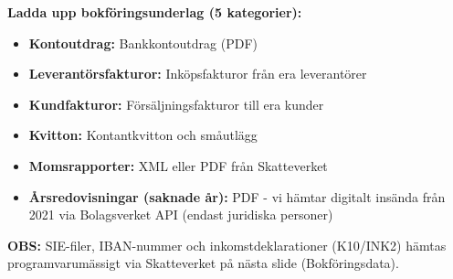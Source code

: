 \documentclass[10pt]{beamer}
\begin{document}
\begin{frame}[label=bokforingsunderlag]
  \vspace{0.4cm}
  \textbf{Ladda upp bokföringsunderlag (5 kategorier):}\\
  \vspace{0.2cm}
  \footnotesize
  \begin{itemize}
    \item \textbf{Kontoutdrag:} Bankkontoutdrag (PDF)
    \item \textbf{Leverantörsfakturor:} Inköpsfakturor från era leverantörer
    \item \textbf{Kundfakturor:} Försäljningsfakturor till era kunder
    \item \textbf{Kvitton:} Kontantkvitton och småutlägg
    \item \textbf{Momsrapporter:} XML eller PDF från Skatteverket
    \item \textbf{Årsredovisningar (saknade år):} PDF - vi hämtar digitalt insända från 2021 via Bolagsverket API (endast juridiska personer)
  \end{itemize}
  
  \vspace{0.3cm}
  \textbf{OBS:} SIE-filer, IBAN-nummer och inkomstdeklarationer (K10/INK2) hämtas programvarumässigt via Skatteverket på nästa slide (Bokföringsdata).
  
  \vspace{0.3cm}
  
  \vspace{0.3cm}
  \begin{flushright}
    \hyperlink{likviditet}{}
  \end{flushright}
\end{frame}
\end{document}
